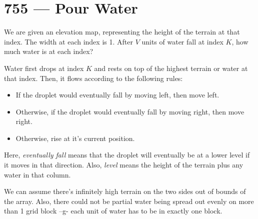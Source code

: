 \section{755 --- Pour Water}
We are given an elevation map,  representing the height of the terrain at that index. The width at each index is 1. After $ V $ units of water fall at index $K$, how much water is at each index?

Water first drops at index $K$ and rests on top of the highest terrain or water at that index. Then, it flows according to the following rules:

\begin{itemize}
\item If the droplet would eventually fall by moving left, then move left.
\item Otherwise, if the droplet would eventually fall by moving right, then move right.
\item Otherwise, rise at it's current position.
\end{itemize}

Here, \textit{eventually fall} means that the droplet will eventually be at a lower level if it moves in that direction. Also, \textit{level} means the height of the terrain plus any water in that column.

We can assume there's infinitely high terrain on the two sides out of bounds of the array. Also, there could not be partial water being spread out evenly on more than 1 grid block --g- each unit of water has to be in exactly one block.


